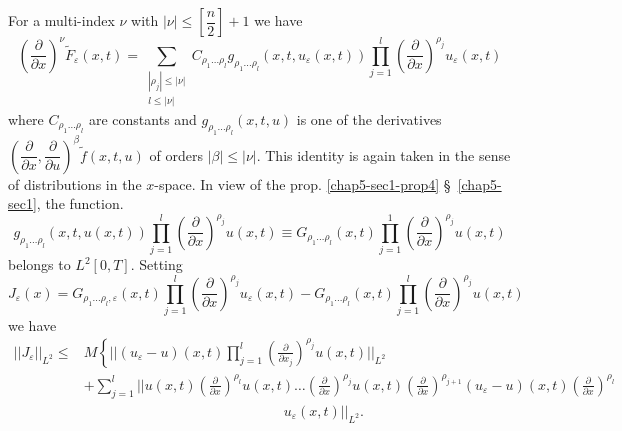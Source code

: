 For a multi-index $\nu$ with $| \nu  | \leq [\dfrac{n}{2}] + 1$ we have
\begin{equation*}
\left(\frac{\partial}{\partial x}\right)^\nu \tilde{F}_\varepsilon (x, t) =
  \sum_{\substack{|\rho_j |\leq|\nu| \\ {l\leq|\nu|}}}
  C_{\rho_1 \ldots \rho_l} g_{\rho_1 \ldots \rho_l}(x, t,
  u_\varepsilon (x, t)) \prod\limits^l_{j=1} \left(\frac{\partial}{\partial 
    x}\right)^{\rho_j} u_\varepsilon (x, t) \tag{2.4}\label{chap5-eq2.4}
\end{equation*}
where $C_{\rho_1 \ldots \rho_l}$ are constants and $g_{\rho_1 \ldots
  \rho_l}(x, t, u)$ is one of the derivatives
$\left(\dfrac{\partial}{\partial x},\dfrac{\partial}{\partial
  u}\right)^\beta \tilde{f} (x, t, u)$ of orders $| \beta | \leq | \nu
|$. This identity 
is again taken in the sense of distributions in the $x$-space. In view
of the prop. \ref{chap5-sec1-prop4} \S\ \ref{chap5-sec1}, the function. 
\begin{equation*}
g_{\rho_1 \ldots \rho_l} (x, t, u (x, t))\prod\limits^l_{j=1}
\left(\frac{\partial}{\partial x}\right)^{\rho_j}u (x, t) \equiv G_{\rho_1 \ldots
  \rho_l} (x, t) \prod\limits^1_{j=1} \left(\frac{\partial}{\partial
  x}\right)^{\rho_j}u (x, t) \tag{2.5} \label{chap5-eq2.5}
\end{equation*}
belongs to $L^2[0, T]$. Setting
\begin{equation*}
J_\varepsilon (x) = G_{\rho_1 \ldots \rho_l,\varepsilon} (x, t)\prod\limits^l_{j=1}
\left(\frac{\partial}{\partial x}\right)^{\rho_j}u_\varepsilon (x, t)-
G_{\rho_1 \ldots \rho_l} (x, t) \prod\limits^l_{j=1}
\left(\frac{\partial}{\partial x}\right)^{\rho_j}u (x, t)
\tag{2.6}\label{chap5-eq2.6}  
\end{equation*}
we have
{\fontsize{9pt}{11pt}\selectfont
\begin{align*}
|| J_\varepsilon ||_{L^2} \leq &  M \left\{ || (u_\varepsilon - u)
(x, t) \prod\limits^l_{j=1} \left(\frac{\partial}{\partial
  x_j}\right)^{\rho_j} u (x, t) ||_{L^2}\right. \\ 
 & + \sum^l_{j=1} || u (x, t)\left(\frac{\partial}{\partial
  x}\right)^{\rho_l} u 
 (x, t) \ldots \left(\frac{\partial}{\partial x}\right)^{\rho_{j}} u (x,
 t)\left(\frac{\partial}{\partial x}\right)^{\rho_{j+1}} (u_\varepsilon - u) (x,
 t) \left(\frac{\partial}{\partial x}\right)^{\rho_l} \\
& \hspace{6cm} u_\varepsilon (x, t)  ||_{L^2}.  
\end{align*}}\relax

